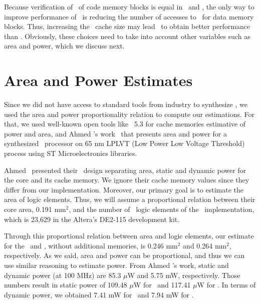 Because verification of \ptags~of code memory blocks is equal in \timestamp~and \cshiamt, the only way to improve performance of \cshia~is reducing the number of accesses to \ptagmem~for data memory blocks. Thus, increasing the \ptag~cache size may lead \cshiamt~to obtain better performance than \timestamp. Obviously, these choices need to take into account other variables such as area and power, which we discuss next.

\section{Area and Power Estimates}
\label{subsec:Power-and-Area-Estimative}

Since we did not have access to standard tools from industry to synthesize \vhdl, we used the area and power proportionality relation \cite{Nemani1999:Area-Power} to compute our estimations. For that, we used well-known open tools like \cacti~5.3 \cite{HP:Cacti53} for cache memories estimative of power and area, and Ahmed \etal's work~\cite{Ahmed2009:Leon} that presents area and power for a synthesized \leon~processor on 65 nm LPLVT (Low Power Low Voltage Threshold) process using ST Microelectronics libraries.

Ahmed \etal~presented their \leon~design separating area, static and dynamic power for the core and its cache memory. We ignore their cache memory values since they differ from our implementation. Moreover, our primary goal is to estimate the area of logic elements. Thus, we will assume a proportional relation between their core area, 0.191 mm$^{2}$, and the number of \fpga~logic elements of the \baseline~implementation, which is 23,629 in the Altera's DE2-115 development kit. %

Through this proportional relation between area and logic elements, our estimate for the \timestamp~and \cshiamt, without additional memories, is 0.246 mm$^{2}$ and 0.264 mm$^{2}$, respectively. As we said, area and power can be proportional, and thus we can use similar reasoning to estimate power. From Ahmed \etal's work, static and dynamic power (at 100 MHz) are 85.3 $\mu$W and 5.75 mW, respectively. Those numbers result in static power of 109.48 $\mu$W for \timestamp~and 117.41 $\mu$W for \cshiamt. In terms of dynamic power, we obtained 7.41 mW for \timestamp~and 7.94 mW for \cshiamt.

